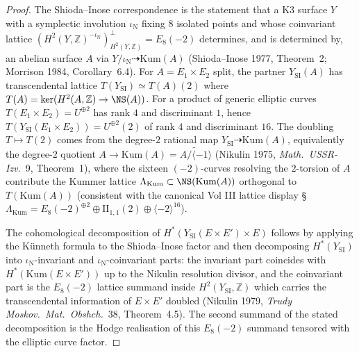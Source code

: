 \begin{proof}
The Shioda--Inose correspondence is the statement that a K3 surface
$Y$ with a symplectic involution $\iota_{\mathrm N}$ fixing $8$
isolated points and whose coinvariant lattice
$(H^2(Y, \mathbb Z)^{-\iota_{\mathrm N}})^\perp_{H^2(Y, \mathbb Z)} = E_8(-2)$
determines, and is determined by, an abelian surface $A$ via
$Y/\iota_{\mathrm N} \dashrightarrow \mathrm{Kum}(A)$ (Shioda--Inose
1977, Theorem~2; Morrison 1984, Corollary~6.4). For
$A = E_1 \times E_2$ split, the partner $Y_{\mathrm{SI}}(A)$ has
transcendental lattice $T(Y_{\mathrm{SI}}) \simeq T(A)(2)$ where
$T(A) = \ker(H^2(A, \mathbb Z) \to \NS(A))$. For a product of
generic elliptic curves $T(E_1 \times E_2) = U^{\oplus 2}$ has rank
$4$ and discriminant $1$, hence
$T(Y_{\mathrm{SI}}(E_1 \times E_2)) = U^{\oplus 2}(2)$ of rank $4$
and discriminant $16$. The doubling $T \mapsto T(2)$ comes from the
degree-$2$ rational map
$Y_{\mathrm{SI}} \dashrightarrow \mathrm{Kum}(A)$, equivalently
the degree-$2$ quotient $A \to \mathrm{Kum}(A) = \widetilde{A/\langle -1 \rangle}$
(Nikulin 1975, \emph{Math.\ USSR-Izv.}~9, Theorem~1), where the
sixteen $(-2)$-curves resolving the $2$-torsion of $A$ contribute
the Kummer lattice $\Lambda_{\mathrm{Kum}} \subset \NS(\mathrm{Kum}(A))$
orthogonal to $T(\mathrm{Kum}(A))$ (consistent with the canonical
Vol III lattice display
\cite{VolI} \S
$\Lambda_{\mathrm{Kum}} = E_8(-2)^{\oplus 2} \oplus \mathrm{II}_{1,1}(2) \oplus \langle -2 \rangle^{16}$).

The cohomological decomposition of
$H^*(Y_{\mathrm{SI}}(E \times E') \times E)$ follows by applying the
K\"unneth formula to the Shioda--Inose factor and then decomposing
$H^*(Y_{\mathrm{SI}})$ into $\iota_{\mathrm N}$-invariant and
$\iota_{\mathrm N}$-coinvariant parts: the invariant part coincides
with $H^*(\mathrm{Kum}(E \times E'))$ up to the Nikulin resolution
divisor, and the coinvariant part is the $E_8(-2)$ lattice summand
inside $H^2(Y_{\mathrm{SI}}, \mathbb Z)$ which carries the
transcendental information of $E \times E'$ doubled
(Nikulin 1979, \emph{Trudy Moskov.\ Mat.\ Obshch.}~38, Theorem~4.5).
The second summand of the stated decomposition is the Hodge realisation
of this $E_8(-2)$ summand tensored with the elliptic curve factor.
\end{proof}

